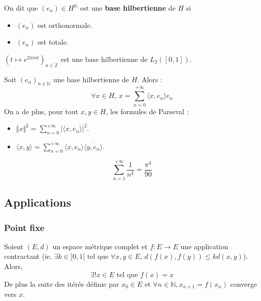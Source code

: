 
  \begin{definition}
    On dit que $(e_n) \in H^{\mathbb{N}}$ est une \textbf{base hilbertienne} de $H$ si
    \begin{itemize}
      \item $(e_n)$ est orthonormale.
      \item $(e_n)$ est totale.
    \end{itemize}
  \end{definition}

  \begin{example}
    $(t \mapsto e^{2\pi int})_{n \in \mathbb{Z}}$ est une base hilbertienne de $L_2([0,1])$.
  \end{example}

  \begin{theorem}
    Soit $(e_n)_{n \in \mathbb{N}}$ une base hilbertienne de $H$. Alors :
    \[ \forall x \in H, \, x = \sum_{n=0}^{+\infty} \langle x, e_n \rangle e_n \]
    On a de plus, pour tout $x, y \in H$, les formules de Parseval :
    \begin{itemize}
      \item $\Vert x \Vert^2 = \sum_{n=0}^{+\infty} \vert \langle x, e_n \rangle \vert^2$.
      \item $\langle x, y \rangle = \sum_{n=0}^{+\infty} \langle x, e_n \rangle \overline{\langle y, e_n \rangle}$.
    \end{itemize}
  \end{theorem}


  \begin{application}
    \[ \sum_{n = 1}^{+\infty} \frac{1}{n^4} = \frac{\pi^4}{90} \]
  \end{application}

  \subsection{Applications}

  \subsubsection{Point fixe}


  \begin{theorem}
    Soient $(E,d)$ un espace métrique complet et $f : E \rightarrow E$ une application contractant (ie. $\exists k \in ]0,1[ \text{ tel que } \forall x, y \in E, \, d(f(x), f(y)) \leq k d(x, y)$). Alors,
    \[ \exists! x \in E \text{ tel que } f(x) = x \]
    De plus la suite des itérés définie par $x_0 \in E$ et $\forall n \in \mathbb{N}, x_{n+1} = f(x_n)$ converge vers $x$.
  \end{theorem}

